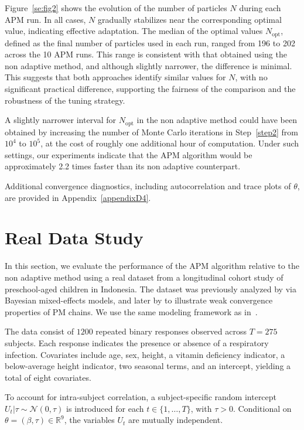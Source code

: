 \documentclass[pdflatex,sn-mathphys-num]{sn-jnl}
\theoremstyle{thmstyleone}
\theoremstyle{thmstyletwo}
\theoremstyle{thmstylethree}
\begin{document}
Figure~\ref{se:fig2} shows the evolution of the number of particles \( N \) during each APM run. In all cases, \( N \) gradually stabilizes near the corresponding optimal value, indicating effective adaptation. The median of the optimal values \( N_{\text{opt}} \), defined as the final number of particles used in each run, ranged from 196 to 202 across the 10 APM runs. This range is consistent with that obtained using the non adaptive method, and although slightly narrower, the difference is minimal. This suggests that both approaches identify similar values for \( N \), with no significant practical difference, supporting the fairness of the comparison and the robustness of the tuning strategy.

A slightly narrower interval for \( N_{\text{opt}} \) in the non adaptive method could have been obtained by increasing the number of Monte Carlo iterations in Step~\ref{step2} from \( 10^4 \) to \( 10^5 \), at the cost of roughly one additional hour of computation. Under such settings, our experiments indicate that the APM algorithm would be approximately 2.2 times faster than its non adaptive counterpart.

Additional convergence diagnostics, including autocorrelation and trace plots of \( \theta \), are provided in Appendix~\ref{appendixD4}.

\section{Real Data Study}
\label{sec:realex}
In this section, we evaluate the performance of the APM algorithm relative to the non adaptive method using a real dataset from a longitudinal cohort study of preschool-aged children in Indonesia. The dataset was previously analyzed by \cite{zeger_generalized_1991} via Bayesian mixed-effects models, and later by \cite{schmon_large-sample_2021} to illustrate weak convergence properties of PM chains. We use the same modeling framework as in~\cite{schmon_large-sample_2021}.

The data consist of \(1200 \) repeated binary responses observed across \( T = 275 \) subjects. Each response indicates the presence or absence of a respiratory infection. Covariates include age, sex, height, a vitamin deficiency indicator, a below-average height indicator, two seasonal terms, and an intercept, yielding a total of eight covariates.

To account for intra-subject correlation, a subject-specific random intercept \( U_t|\tau \sim \mathcal{N}(0, \tau) \) is introduced for each \( t \in \{1, \dots, T\} \), with \( \tau > 0 \). Conditional on \( \theta = (\beta, \tau) \in \mathbb{R}^9 \), the variables \( U_t \) are mutually independent.
\end{document}
